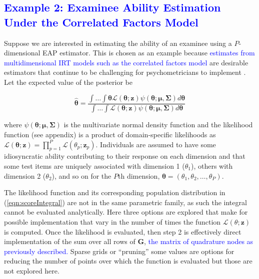 \documentclass[12pt]{article}
\begin{document}
\subsection*{\textcolor{blue}{Example 2: Examinee Ability Estimation Under the Correlated Factors Model}}

Suppose we are interested in estimating the ability of an examinee using a $P$-dimensional EAP estimator. This is chosen as an example because \textcolor{blue}{estimates from multidimensional IRT models such as the correlated factors model \cite{cai:fisher}} are desirable estimators that continue to be challenging for psychometricians to implement \cite{Chalmers,ferrando}. Let the expected value of the posterior be 

\begin{equation}
\label{eqn:scoreIntegral}
\widehat{\boldsymbol{\theta}} = \frac{\int \dots \int \boldsymbol{\theta} \mathcal{L}(\boldsymbol{\theta};\boldsymbol{z}) \psi(\boldsymbol{\theta};\boldsymbol{\mu},\boldsymbol{\Sigma})d\boldsymbol{\theta}}{\int \dots \int \mathcal{L}(\boldsymbol{\theta};\boldsymbol{z})\psi(\boldsymbol{\theta};\boldsymbol{\mu},\boldsymbol{\Sigma})d\boldsymbol{\theta}}
\end{equation}

\noindent where $\psi(\boldsymbol{\theta};\boldsymbol{\mu},\boldsymbol{\Sigma})$ is the multivariate normal density function and the likelihood function (see appendix) is a product of domain-specific likelihoods as $\mathcal{L}(\boldsymbol{\theta};\boldsymbol{z}) = \prod^P_{p=1}\mathcal{L}(\theta_p;\bm{z}_p)$. Individuals are assumed to have some idiosyncratic ability contributing to their response on each dimension and that some test items are uniquely associated with dimension 1 ($\theta_1$), others with dimension 2 ($\theta_2$), and so on for the $P$th dimension, $\boldsymbol{\theta}\boldsymbol{=}(\theta_1, \theta_2,\dots ,\theta_P)$. 

The likelihood function and its corresponding population distribution in (\ref{eqn:scoreIntegral}) are not in the same parametric family, as such the integral cannot be evaluated analytically. Here three options are explored that make for possible implementation that vary in the number of times the function $\mathcal{L}(\theta;\bm{z})$ is computed. Once the likelihood is evaluated, then step 2 is effectively direct implementation of the sum over all rows of $\bm{G}$, \textcolor{blue}{the matrix of quadrature nodes as previously described.} Sparse grids or ``pruning'' some values are options for reducing the number of points over which the function is evaluated but those are not explored here. 
\end{document}
